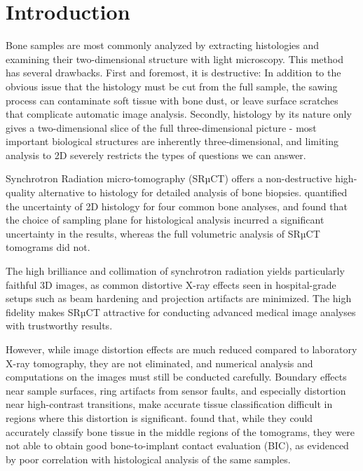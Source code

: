 \section{Introduction}
\label{sec:intro}

Bone samples are most commonly analyzed by extracting histologies and examining
their two-dimensional structure with light microscopy. This method has several
drawbacks. First and foremost, it is destructive: In addition to the obvious
issue that the histology must be cut from the full sample, the sawing process
can contaminate soft tissue with bone dust, or leave surface scratches that
complicate automatic image analysis. Secondly, histology by its nature only
gives a two-dimensional slice of the full three-dimensional picture - most
important biological structures are inherently three-dimensional, and limiting
analysis to 2D severely restricts the types of questions we can answer.

Synchrotron Radiation micro-tomography (SRµCT) offers a non-destructive
high-quality alternative to histology for detailed analysis of bone biopsies.
\cite{torsten2018} quantified the uncertainty of 2D histology for four common
bone analyses, and found that the choice of sampling plane for histological
analysis incurred a significant uncertainty in the results, whereas the full
volumetric analysis of SRµCT tomograms did not.

The high brilliance and collimation of synchrotron radiation yields
particularly faithful 3D images, as common distortive X-ray effects seen in
hospital-grade setups such as beam hardening and projection artifacts are
minimized. The high fidelity makes SRµCT attractive for conducting advanced
medical image analyses with trustworthy results.

However, while image distortion effects are much reduced compared to laboratory
X-ray tomography, they are not eliminated, and numerical analysis and
computations on the images must still be conducted carefully. Boundary effects
near sample surfaces, ring artifacts from sensor faults, and especially
distortion near high-contrast transitions, make accurate tissue classification
difficult in regions where this distortion is significant. \cite{sporring}
found that, while they could accurately classify bone tissue in the middle
regions of the tomograms, they were not able to obtain good bone-to-implant
contact evaluation (BIC), as evidenced by poor correlation with histological
analysis of the same samples.

% 

